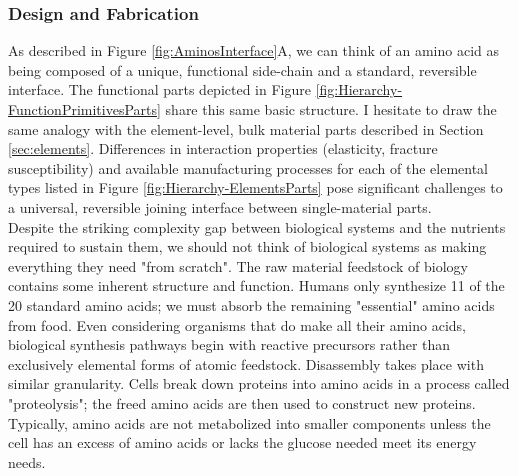{\subsubsection{Design and Fabrication}



As described in Figure \ref{fig:AminosInterface}A, we can think of an amino acid as being composed of a unique, functional side-chain and a standard, reversible interface.  The functional parts depicted in Figure \ref{fig:Hierarchy-FunctionPrimitivesParts} share this same basic structure.  I hesitate to draw the same analogy with the element-level, bulk material parts described in Section \ref{sec:elements}.  Differences in interaction properties (elasticity, fracture susceptibility) and available manufacturing processes for each of the elemental types listed in Figure \ref{fig:Hierarchy-ElementsParts} pose significant challenges to a universal, reversible joining interface between single-material parts.\\

Despite the striking complexity gap between biological systems and the nutrients required to sustain them, we should not think of biological systems as making everything they need "from scratch".  The raw material feedstock of biology contains some inherent structure and function.  Humans only synthesize 11 of the 20 standard amino acids; we must absorb the remaining "essential" amino acids from food.  Even considering organisms that do make all their amino acids, biological synthesis pathways begin with reactive precursors rather than exclusively elemental forms of atomic feedstock\cite{Stryer1988}.  Disassembly takes place with similar granularity.  Cells break down proteins into amino acids in a process called "proteolysis"; the freed amino acids are then used to construct new proteins.  Typically, amino acids are not metabolized into smaller components unless the cell has an excess of amino acids or lacks the glucose needed meet its energy needs\cite{Stryer1988}.\\

}
